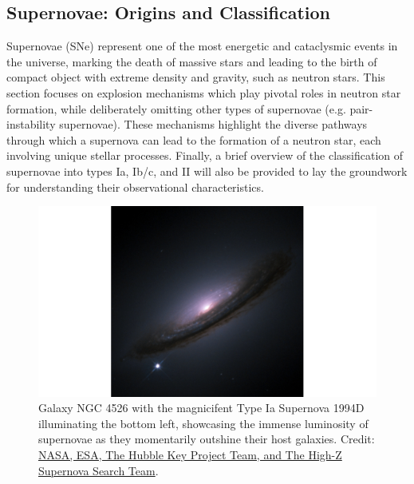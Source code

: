 \documentclass[main.tex]{subfiles}
\begin{document}
    \subsection{Supernovae: Origins and Classification}\label{sec:ch1:transients}
    Supernovae (SNe) represent one of the most energetic and cataclysmic events in the universe, marking the death of massive stars and leading to the birth of compact object with extreme density and gravity, such as neutron stars. This section focuses on explosion mechanisms which play pivotal roles in neutron star formation, while deliberately omitting other types of supernovae (e.g. pair-instability supernovae). These mechanisms highlight the diverse pathways through which a supernova can lead to the formation of a neutron star, each involving unique stellar processes. Finally, a brief overview of the classification of supernovae into types Ia, Ib/c, and II will also be provided to lay the groundwork for understanding their observational characteristics.
    \begin{figure}[t]
        \centering
        \includegraphics[scale=0.2]{figures/chapter1/SN1994D_NGC4526.png}
        \caption{Galaxy NGC 4526 with the magnicifent Type Ia Supernova 1994D illuminating the bottom left, showcasing the immense luminosity of supernovae as they momentarily outshine their host galaxies. Credit: \href{https://hubblesite.org/contents/media/images/1999/19/813-Image.html}{NASA, ESA, The Hubble Key Project Team, and The High-Z Supernova Search Team}.}
        \label{fig:sn1994d}
    \end{figure}
\end{document}
